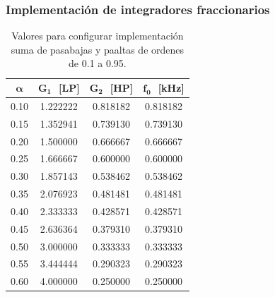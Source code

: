 \documentclass[10pt]{beamer}
\begin{document}
	\begin{frame}
		\frametitle{Implementación de integradores fraccionarios}
		\begin{minipage}[b]{0.45\textwidth}
			\begin{tiny}
			\begin{table}[!hbp]                                      
		\centering   
		\caption{Valores para configurar implementación suma de pasabajas y paaltas de ordenes de 0.1 a 0.95.}                            
		\label{tab:calculos_bilineal_suma}                                        
			\begin{tabular}{cccc}                        
			\hline                                              
			$\bm{\alpha}$ & $\bm{G_{1}}\,\,$ [LP] & $\bm{G_{2}}\,\,$ [HP] & $\bm{f_{0}}\,\,$ [kHz]  \\            
			\hline                                              
			0.10 & 1.222222 & 0.818182 & 0.818182 \\ 
			                                 
			0.15 & 1.352941 & 0.739130 & 0.739130 \\ 
			                                 
			0.20 & 1.500000 & 0.666667 & 0.666667 \\ 
			                                
			0.25 & 1.666667 & 0.600000 & 0.600000 \\ 
			                                  
			0.30 & 1.857143 & 0.538462 & 0.538462 \\ 
			                                  
			0.35 & 2.076923 & 0.481481 & 0.481481 \\ 
			                                  
			0.40 & 2.333333 & 0.428571 & 0.428571 \\ 
			                               
			0.45 & 2.636364 & 0.379310 & 0.379310 \\ 
			                                 
			0.50 & 3.000000 & 0.333333 & 0.333333 \\ 
			                                   
			0.55 & 3.444444 & 0.290323 & 0.290323 \\ 
			                                  
			0.60 & 4.000000 & 0.250000 & 0.250000 \\ 
			                                 

\end{tabular}
\end{table}
\end{tiny}
\end{minipage}
\end{frame}
\end{document}

